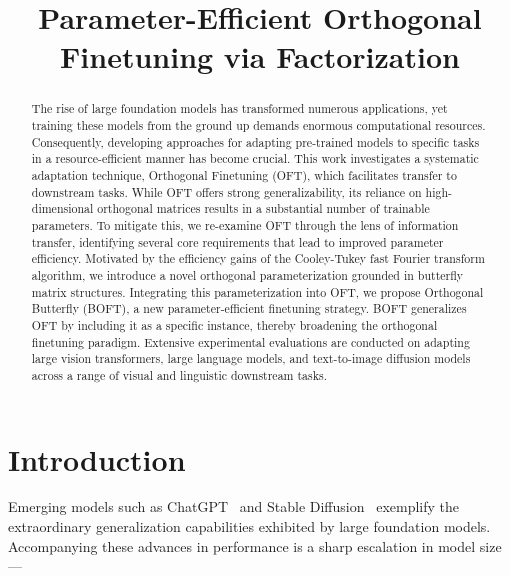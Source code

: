 \title{Parameter-Efficient Orthogonal Finetuning via Factorization}

\begin{abstract}
The rise of large foundation models has transformed numerous applications, yet training these models from the ground up demands enormous computational resources. Consequently, developing approaches for adapting pre-trained models to specific tasks in a resource-efficient manner has become crucial. This work investigates a systematic adaptation technique, Orthogonal Finetuning (OFT), which facilitates transfer to downstream tasks. While OFT offers strong generalizability, its reliance on high-dimensional orthogonal matrices results in a substantial number of trainable parameters. To mitigate this, we re-examine OFT through the lens of information transfer, identifying several core requirements that lead to improved parameter efficiency. Motivated by the efficiency gains of the Cooley-Tukey fast Fourier transform algorithm, we introduce a novel orthogonal parameterization grounded in butterfly matrix structures. Integrating this parameterization into OFT, we propose Orthogonal Butterfly (BOFT), a new parameter-efficient finetuning strategy. BOFT generalizes OFT by including it as a specific instance, thereby broadening the orthogonal finetuning paradigm. Extensive experimental evaluations are conducted on adapting large vision transformers, large language models, and text-to-image diffusion models across a range of visual and linguistic downstream tasks.
\end{abstract}

\section{Introduction}

Emerging models such as ChatGPT~\cite{brown2020language,chen2021evaluating} and Stable Diffusion~\cite{rombach2022high} exemplify the extraordinary generalization capabilities exhibited by large foundation models. Accompanying these advances in performance is a sharp escalation in model size—

